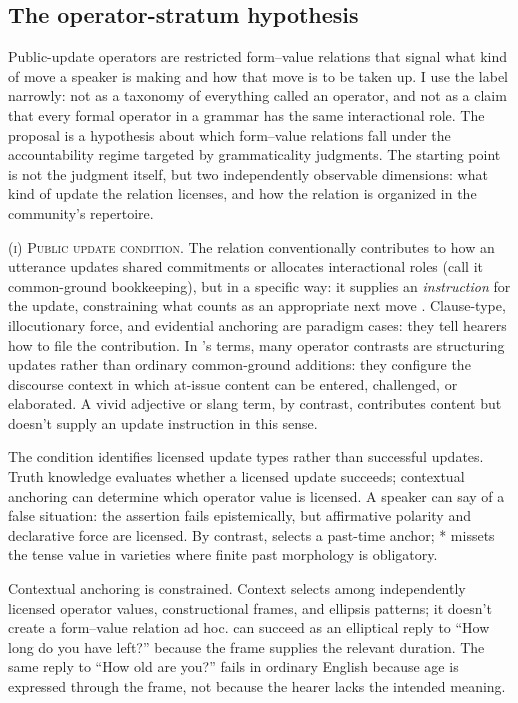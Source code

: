 \documentclass[12pt,letterpaper]{article}
\begin{document}
\subsection{The operator-stratum hypothesis}

Public-update operators are restricted form--value relations that signal what kind of move a speaker is making and how that move is to be taken up. I use the label narrowly: not as a taxonomy of everything called an operator, and not as a claim that every formal operator in a grammar has the same interactional role. The proposal is a hypothesis about which form--value relations fall under the accountability regime targeted by grammaticality judgments. The starting point is not the judgment itself, but two independently observable dimensions: what kind of update the relation licenses, and how the relation is organized in the community's repertoire.

\textsc{(i) Public update condition.} The relation conventionally contributes to how an utterance updates shared commitments or allocates interactional roles (call it common-ground bookkeeping), but in a specific way: it supplies an \emph{instruction} for the update, constraining what counts as an appropriate next move \citep{stalnaker2002,farkasbruce2010,murray2014update}. Clause-type, illocutionary force, and evidential anchoring are paradigm cases: they tell hearers how to file the contribution. In \textcite{murray2014update}'s terms, many operator contrasts are structuring updates rather than ordinary common-ground additions: they configure the discourse context in which at-issue content can be entered, challenged, or elaborated. A vivid adjective or slang term, by contrast, contributes content but doesn't supply an update instruction in this sense.

The condition identifies licensed update types rather than successful updates. Truth knowledge evaluates whether a licensed update succeeds; contextual anchoring can determine which operator value is licensed. A speaker can say  of a false situation: the assertion fails epistemically, but affirmative polarity and declarative force are licensed. By contrast,  selects a past-time anchor; * missets the tense value in varieties where finite past morphology is obligatory.

Contextual anchoring is constrained. Context selects among independently licensed operator values, constructional frames, and ellipsis patterns; it doesn't create a form--value relation ad hoc.  can succeed as an elliptical reply to \enquote{How long do you have left?} because the frame supplies the relevant duration. The same reply to \enquote{How old are you?} fails in ordinary English because age is expressed through the  frame, not because the hearer lacks the intended meaning.
\end{document}

